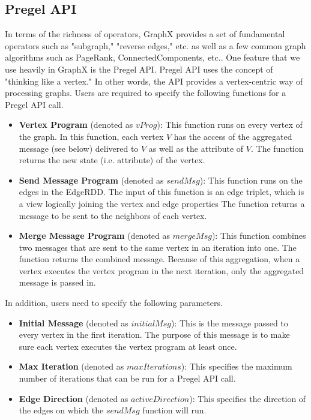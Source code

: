 \subsection{Pregel API}
%
In terms of the richness of operators, GraphX provides a set of fundamental operators such as "subgraph," "reverse edges," etc. as well as a few common graph algorithms such as PageRank, ConnectedComponents, etc..
%
One feature that we use heavily in GraphX is the Pregel API.
%
Pregel API uses the concept of "thinking like a vertex."
%
In other words, the API provides a vertex-centric way of processing graphs.
%
Users are required to specify the following functions for a Pregel API call.
%
\begin{itemize}

\item \textbf{Vertex Program} (denoted as $vProg$): 
%
This function runs on every vertex of the graph.
%
In this function, each vertex $V$ has the access of the aggregated message (see below) delivered to $V$ as well as the attribute of $V$.
%
The function returns the new state (i.e. attribute) of the vertex.
%
\item \textbf{Send Message Program} (denoted as $sendMsg$):
%
This function runs on the edges in the EdgeRDD. 
%
The input of this function is an edge triplet, which is a view logically joining the vertex and edge properties
%
The function returns a message to be sent to the neighbors of each vertex.
%
\item \textbf{Merge Message Program} (denoted as $mergeMsg$):
%
This function combines two messages that are sent to the same vertex in an iteration into one.
%
The function returns the combined message.
%
Because of this aggregation, when a vertex executes the vertex program in the next iteration, only the aggregated message is passed in.
%
\end{itemize}
%
In addition, users need to specify the following parameters.
%
\begin{itemize}
%
\item \textbf{Initial Message} (denoted as $initialMsg$):
%
This is the message passed to every vertex in the first iteration.
%
The purpose of this message is to make sure each vertex executes the vertex program at least once.
%
\item \textbf{Max Iteration} (denoted as $maxIterations$):
%
This specifies the maximum number of iterations that can be run for a Pregel API call.
%
\item \textbf{Edge Direction} (denoted as $activeDirection$):
%
This specifies the direction of the edges on which the $sendMsg$ function will run.
%
\end{itemize}
